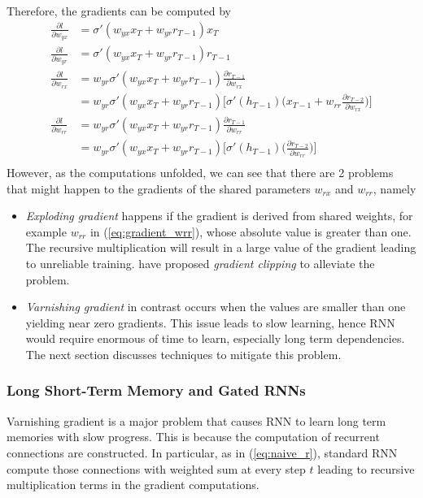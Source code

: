 Therefore, the gradients can be computed by 
\begin{align}
	\frac{\partial l}{\partial w_{yx}} &= \sigma'(w_{yx} x_T   + w_{yr} r_{T-1}) x_T \\
	\frac{\partial l}{\partial w_{yr}} &= \sigma'(w_{yx} x_T   + w_{yr} r_{T-1}) r_{T-1} \\
	\frac{\partial l}{\partial w_{rx}} &= 	w_{yr} \sigma'(w_{yx} x_T   + w_{yr} r_{T-1}) \frac{\partial r_{T-1}}{\partial w_{rx}} \\
	&= w_{yr} \sigma'(w_{yx} x_T   + w_{yr} r_{T-1})  \Bigg[ \sigma'(h_{T-1}) \bigg( x_{T-1} + w_{rr}  \frac{\partial r_{T-2}}{\partial w_{rx}} \bigg) \Bigg]  \label{eq:gradient_wrr}  \\
	\frac{\partial l}{\partial w_{rr}} &= w_{yr} \sigma'(w_{yx} x_T   + w_{yr} r_{T-1})  \frac{\partial r_{T-1}}{\partial w_{rr}}  \\
	&= w_{yr} \sigma'(w_{yx} x_T   + w_{yr} r_{T-1})  \Bigg[ \sigma'(h_{T-1}) \bigg( \frac{\partial r_{T-2}}{\partial w_{rr}} \bigg) \Bigg] \\
\end{align}
However, as the computations unfolded, we can see that there are 2 problems that might happen to the gradients of the shared parameters $w_{rx}$ and $ w_{rr}$, namely
\begin{itemize}
	\item \textit{Exploding gradient} happens if the gradient is derived from shared weights, for example $w_{rr}$ in  (\ref{eq:gradient_wrr}), whose absolute value is greater than one. The recursive multiplication will result in a large value of the gradient leading to unreliable training. \cite{PascanuUnderstandingexplodinggradient2012} have proposed \textit{gradient clipping} to alleviate the problem.
	\item \textit{Varnishing gradient}  in contrast occurs when the values are smaller than one yielding  near zero gradients. This issue leads to slow learning, hence RNN would require enormous of time to learn, especially long term dependencies. The next section discusses techniques to mitigate this problem.
\end{itemize}


\subsubsection{Long Short-Term Memory and Gated RNNs}
Varnishing gradient is a major problem that causes RNN to learn long term memories with slow progress. This is because the computation of recurrent connections are constructed. In particular, as in (\ref{eq:naive_r}), standard RNN compute those connections with weighted sum at every step $t$ leading to recursive multiplication terms in the gradient computations.

